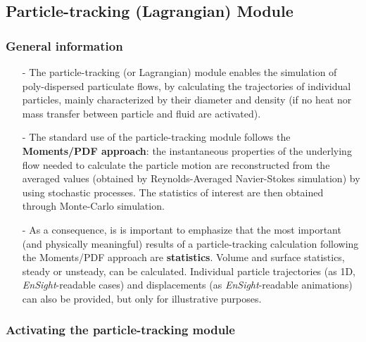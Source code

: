 {{{%
\subsection{Particle-tracking (Lagrangian) Module}

\subsubsection{General information}\label{sec:over-lag}

\begin{itemize}

\item[-] The particle-tracking (or Lagrangian) module enables the simulation of poly-dispersed particulate flows, by calculating the trajectories of individual particles, mainly characterized by their diameter and density (if no heat nor mass transfer between particle and fluid are activated).

\item[-] The standard use of the particle-tracking module follows the \textbf{Moments/PDF approach}: the instantaneous properties of the underlying flow needed to calculate the particle motion are reconstructed from the averaged values (obtained by Reynolds-Averaged Navier-Stokes simulation) by using stochastic processes. The statistics of interest are then obtained through Monte-Carlo simulation.

\item[-] As a consequence, is is important to emphasize that the most important (and physically meaningful) results of a particle-tracking calculation following the Moments/PDF approach are \mbox{\textbf{statistics}}. Volume and surface statistics, steady or unsteady, can be calculated. Individual particle trajectories (as 1D, \textit{EnSight}-readable cases) and displacements (as \textit{EnSight}-readable animations) can also be provided, but only for illustrative purposes.

\end{itemize}

\subsubsection{Activating the particle-tracking module}\label{sec:acti-lag}

}}}
